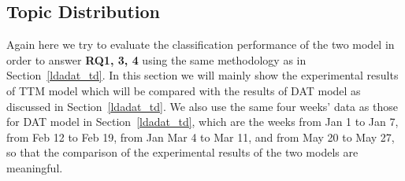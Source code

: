 \subsection{Topic Distribution}\label{dat_ttm_td}

Again here we try to evaluate the classification performance of the two model in order to answer \textbf{RQ1, 3, 4} using the same methodology as in Section~\ref{ldadat_td}. In this section we will mainly show the experimental results of TTM model which will be compared with the results of DAT model as discussed in Section~\ref{ldadat_td}. We also use the same four weeks' data as those for DAT model in Section~\ref{ldadat_td}, which are the weeks from Jan 1 to Jan 7, from Feb 12 to Feb 19, from Jan Mar 4 to Mar 11, and from May 20 to May 27, so that the comparison of the experimental results of the two models are meaningful. 

